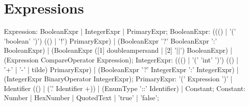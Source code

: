 {\section{Expressions}
\label{expressions}

\begin{rail}
  Expression: BooleanExpr | IntegerExpr | PrimaryExpr;
  BooleanExpr: ((() | '(' 'boolean' ')') (() | '!') PrimaryExpr) | (BooleanExpr '?' BooleanExpr ':' BooleanExpr) | (BooleanExpr ([1] doubleampersand | [2] '||') BooleanExpr) | (Expression CompareOperator Expression);
  IntegerExpr: ((() | '(' 'int' ')') (() | '+' | '-' | tilde) PrimaryExpr) | (BooleanExpr '?' IntegerExpr ':' IntegerExpr) | (IntegerExpr BinaryOperator IntegerExpr);
  PrimaryExpr: '(' Expression ')' | Identifier (() | ('.' Identifier +)) | (EnumType '::' Identifier) | Constant;
  Constant: Number | HexNumber | QuotedText | 'true' | 'false';
\end{rail}

}
